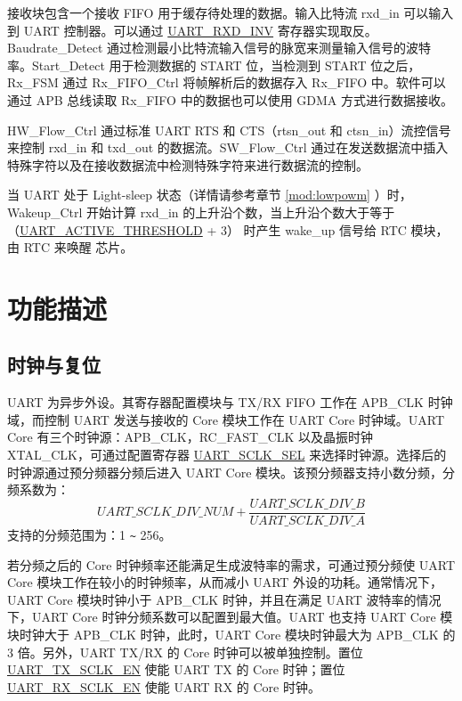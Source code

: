 \documentclass[main\_\_CN.tex]{subfiles}
\begin{document}
接收块包含一个接收 FIFO 用于缓存待处理的数据。输入比特流 rxd\_in 可以输入到 UART 控制器。可以通过
\hyperref[fielddesc:UARTRXDINV]{UART\_RXD\_INV} 寄存器实现取反。Baudrate\_Detect 通过检测最小比特流输入信号的脉宽来测量输入信号的波特率。Start\_Detect 用于检测数据的 START 位，当检测到 START 位之后，Rx\_FSM 通过 Rx\_FIFO\_Ctrl 将帧解析后的数据存入 Rx\_FIFO 中。软件可以通过 APB 总线读取 Rx\_FIFO 中的数据也可以使用 GDMA 方式进行数据接收。

HW\_Flow\_Ctrl 通过标准 UART RTS 和 CTS（rtsn\_out 和 ctsn\_in）流控信号来控制 rxd\_in 和 txd\_out 的数据流。SW\_Flow\_Ctrl 通过在发送数据流中插入特殊字符以及在接收数据流中检测特殊字符来进行数据流的控制。

当 UART 处于 Light-sleep 状态（详情请参考章节 \ref{mod:lowpowm} \textit{}）时，Wakeup\_Ctrl 开始计算 rxd\_in 的上升沿个数，当上升沿个数大于等于 （\hyperref[fielddesc:UARTACTIVETHRESHOLD]{UART\_ACTIVE\_THRESHOLD} + 3） 时产生 wake\_up 信号给 RTC 模块，由 RTC 来唤醒 \chipname{} 芯片。

\section{功能描述}

\subsection{时钟与复位}
UART 为异步外设。其寄存器配置模块与 TX/RX FIFO 工作在 APB\_CLK 时钟域，而控制 UART 发送与接收的 Core 模块工作在 UART Core 时钟域。UART Core 有三个时钟源：APB\_CLK，RC\_FAST\_CLK 以及晶振时钟 XTAL\_CLK，可通过配置寄存器 \hyperref[fielddesc:UARTSCLKSEL]{UART\_SCLK\_SEL} 来选择时钟源。选择后的时钟源通过预分频器分频后进入 UART Core 模块。该预分频器支持小数分频，分频系数为：
\[
\hyperref[fielddesc:UARTSCLKDIVNUM]{UART\_SCLK\_DIV\_NUM} + \frac{\hyperref[fielddesc:UARTSCLKDIVB]{UART\_SCLK\_DIV\_B}}{\hyperref[fielddesc:UARTSCLKDIVA]{UART\_SCLK\_DIV\_A}}
\]
支持的分频范围为：1 \verb+~+ 256。

若分频之后的 Core 时钟频率还能满足生成波特率的需求，可通过预分频使 UART Core 模块工作在较小的时钟频率，从而减小 UART 外设的功耗。通常情况下，UART Core 模块时钟小于 APB\_CLK 时钟，并且在满足 UART 波特率的情况下，UART Core 时钟分频系数可以配置到最大值。UART 也支持 UART Core 模块时钟大于 APB\_CLK 时钟，此时，UART Core 模块时钟最大为 APB\_CLK 的 3 倍。另外，UART TX/RX 的 Core 时钟可以被单独控制。置位 \hyperref[fielddesc:UARTTXSCLKEN]{UART\_TX\_SCLK\_EN} 使能 UART TX 的 Core 时钟；置位 \hyperref[fielddesc:UARTRXSCLKEN]{UART\_RX\_SCLK\_EN} 使能 UART RX 的 Core 时钟。
\end{document}
